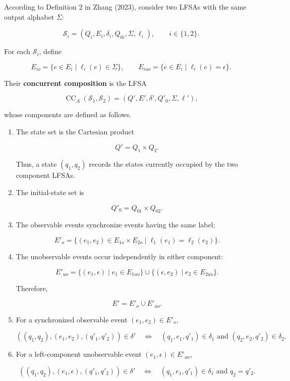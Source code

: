 \documentclass[11pt]{article}
\begin{document}
According to Definition 2 in Zhang (2023), consider two LFSAs with the same output alphabet $\Sigma$:

\[
\mathcal S_i=(Q_i,E_i,\delta_i,Q_{0i},\Sigma,\ell_i),
\qquad i\in\{1,2\}.
\]

For each $\mathcal S_i$, define

\[
E_{io}=\{e\in E_i\mid\ell_i(e)\in\Sigma\},
\qquad
E_{iuo}=\{e\in E_i\mid\ell_i(e)=\epsilon\}.
\]

Their \textbf{concurrent composition} is the LFSA

\[
\operatorname{CC}_{A}(\mathcal S_1,\mathcal S_2)
=(Q',E',\delta',Q'_0,\Sigma,\ell'),
\]

whose components are defined as follows.

\begin{enumerate}
\item The state set is the Cartesian product

\[
   Q'=Q_1\times Q_2.
\]

Thus, a state $(q_1,q_2)$ records the states currently occupied by the two component LFSAs.

\item The initial-state set is

\[
   Q'_0=Q_{01}\times Q_{02}.
\]

\item The observable events synchronize events having the same label:

\[
   E'_o
   =\{(e_1,e_2)\in E_{1o}\times E_{2o}
   \mid\ell_1(e_1)=\ell_2(e_2)\}.
\]

\item The unobservable events occur independently in either component:

\[
   E'_{uo}
   =\{(e_1,\epsilon)\mid e_1\in E_{1uo}\}
   \cup
   \{(\epsilon,e_2)\mid e_2\in E_{2uo}\}.
\]

Therefore,

\[
   E'=E'_o\cup E'_{uo}.
\]

\item For a synchronized observable event $(e_1,e_2)\in E'_o$,

\[
   ((q_1,q_2),(e_1,e_2),(q'_1,q'_2))\in\delta'
   \quad\Longleftrightarrow\quad
   (q_1,e_1,q'_1)\in\delta_1
   \text{ and }
   (q_2,e_2,q'_2)\in\delta_2.
\]

\item For a left-component unobservable event $(e_1,\epsilon)\in E'_{uo}$,

\[
   ((q_1,q_2),(e_1,\epsilon),(q'_1,q'_2))\in\delta'
   \quad\Longleftrightarrow\quad
   (q_1,e_1,q'_1)\in\delta_1
   \text{ and }
   q_2=q'_2.
\]


\end{enumerate}
\end{document}
